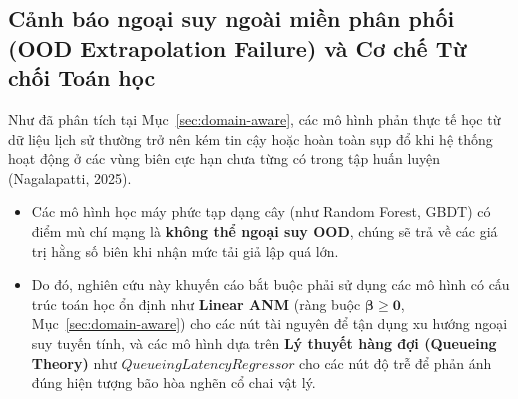 \documentclass[11pt,a4paper]{article}
\begin{document}
\subsection{Cảnh báo ngoại suy ngoài miền phân phối (OOD Extrapolation Failure) và Cơ chế Từ chối Toán học}
\label{sec:ood-refusal}
Như đã phân tích tại Mục~\ref{sec:domain-aware}, các mô hình phản thực tế học từ dữ liệu lịch sử thường trở nên kém tin cậy hoặc hoàn toàn sụp đổ khi hệ thống hoạt động ở các vùng biên cực hạn chưa từng có trong tập huấn luyện (Nagalapatti, 2025).
\begin{itemize}
    \item Các mô hình học máy phức tạp dạng cây (như Random Forest, GBDT) có điểm mù chí mạng là \textbf{không thể ngoại suy OOD}, chúng sẽ trả về các giá trị hằng số biên khi nhận mức tải giả lập quá lớn.
    \item Do đó, nghiên cứu này khuyến cáo bắt buộc phải sử dụng các mô hình có cấu trúc toán học ổn định như \textbf{Linear ANM} (ràng buộc $\boldsymbol\beta \geq \mathbf 0$, Mục~\ref{sec:domain-aware}) cho các nút tài nguyên để tận dụng xu hướng ngoại suy tuyến tính, và các mô hình dựa trên \textbf{Lý thuyết hàng đợi (Queueing Theory)} như $QueueingLatencyRegressor$ cho các nút độ trễ để phản ánh đúng hiện tượng bão hòa nghẽn cổ chai vật lý.
\end{itemize}
\end{document}
